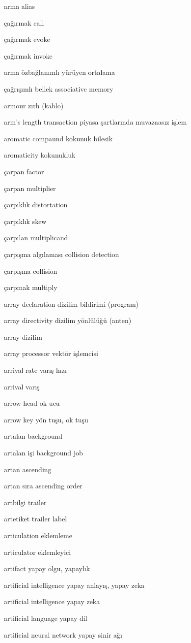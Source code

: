 \documentclass[12pt,fleqn]{article}\usepackage{../../common}
\begin{document}
arma alias

çağırmak call

çağırmak evoke

çağırmak invoke

arma özbağlanımlı yürüyen ortalama

çağrışımlı bellek associative memory

armour zırh (kablo)

arm's length transaction piyasa şartlarında muvazaasız işlem

aromatic compaund kokunuk bilesik

aromaticity kokunukluk

çarpan factor

çarpan multiplier

çarpıklık distortation

çarpıklık skew

çarpılan multiplicand

çarpışma algılaması collision detection

çarpışma collision

çarpmak multiply

array declaration dizilim bildirimi (program)

array directivity dizilim yönlülüğü (anten)

array dizilim

array processor vektör işlemcisi

arrival rate varış hızı

arrival varış

arrow head ok ucu

arrow key yön tuşu, ok tuşu

artalan background

artalan işi background job

artan ascending

artan sıra ascending order

artbilgi trailer

artetiket trailer label

articulation eklemleme

articulator eklemleyici

artifact yapay olgu, yapaylık

artificial intelligence yapay anlayış, yapay zeka

artificial intelligence yapay zeka

artificial language yapay dil

artificial neural network yapay sinir ağı
\end{document}
